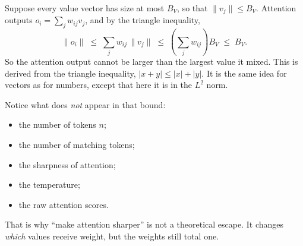 \documentclass[10pt]{article}
\theoremstyle{definition}
\begin{document}
Suppose every value vector has size at most $B_V$, so that
$\|v_j\| \leq B_V$. Attention outputs $o_i = \sum_j w_{ij} v_j$, and by the
triangle inequality,
\begin{equation}
\|o_i\| \;\leq\; \sum_j w_{ij}\,\|v_j\|
        \;\leq\; \left(\sum_j w_{ij}\right) B_V
        \;\leq\; B_V .
\label{eq:attn-bound}
\end{equation}
So the attention output cannot be larger than the largest value it mixed.
This is derived from the triangle inequality, $|x+y| \leq |x| + |y|$. It is
the same idea for vectors as for numbers, except that here it is in the
$L^2$ norm.

Notice what does \emph{not} appear in that bound:
\begin{itemize}
\item the number of tokens $n$;
\item the number of matching tokens;
\item the sharpness of attention;
\item the temperature;
\item the raw attention scores.
\end{itemize}

That is why ``make attention sharper'' is not a theoretical escape. It
changes \emph{which} values receive weight, but the weights still total
one.
\end{document}
